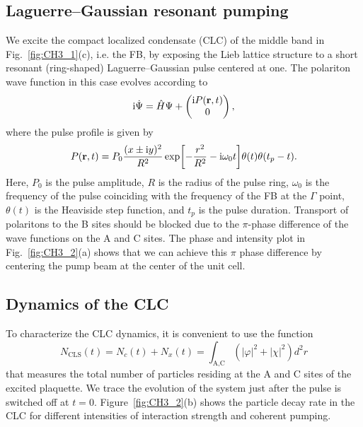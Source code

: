 %
%
\subsection{Laguerre--Gaussian resonant pumping}
We excite the compact localized condensate (CLC) of the middle band in Fig.~\ref{fig:CH3_1}(c), i.e. the FB, by exposing the Lieb lattice structure to a short resonant (ring-shaped) Laguerre--Gaussian pulse centered at one.
The polariton wave function in this case evolves according to
%
\begin{equation}\label{CH3_Evol}
  \mathrm{i}\dot{\Psi} = \hat{H}\Psi+\begin{pmatrix} \mathrm{i} P(\mathbf{r},t)\\{0}\end{pmatrix},
\end{equation}
%
where the pulse profile is given by~\cite{Kim:1999aa}
%
\begin{equation}\label{CH3_Pulse}
  P(\mathbf{r},t)=P_0 \frac{(x\pm{\mathrm{i}}y)^2}{R^2}
  \exp\!\left[-\frac{r^2}{R^2}-\mathrm{i}\omega_0t\right]\!\theta(t)\theta(t_p-t).
\end{equation}
%
Here, $P_0$ is the pulse amplitude, $R$ is the  radius of the pulse ring, $\omega_0$ is the frequency of the pulse coinciding with the frequency of the FB at the $\Gamma$ point, $\theta(t)$ is the Heaviside step function, and $t_p$ is the pulse duration.
Transport of polaritons to the B sites should be blocked due to the $\pi$-phase difference of the wave functions on the A and C sites.
The phase and intensity plot in Fig.~\ref{fig:CH3_2}(a) shows that we can achieve this $\pi$ phase difference by centering the pump beam at the center of the unit cell.

%
%
\subsection{Dynamics of the CLC}
To characterize the CLC dynamics, it is convenient to use the function
%
\begin{equation}\label{CH3_NCLS}
N_\textrm{CLS}\left(t\right)=N_c(t)+N_x(t)=\int_{\textrm{A,C}}\left(|\varphi|^2+|\chi|^2\right) d^2r
\end{equation}
%
that measures the total number of particles residing at the A and C sites of the excited plaquette.
We trace the evolution of the system just after the pulse is switched off at $t=0$.
Figure~\ref{fig:CH3_2}(b) shows the particle decay rate in the CLC for different intensities of interaction strength and coherent pumping.

